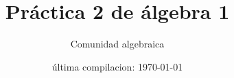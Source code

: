 

\usetikzlibrary{external,angles,quotes}

\def\V{\text{ verdadera }}
\def\eq?{\stackrel{\text{?}}}
\def\eqHI{\stackrel{\text{HI}}}
\def\eqDef{\stackrel{\text{def}}}




\title{Práctica 2 de álgebra 1} %
\author{Comunidad algebraica} %
\date{última compilacion: \today} %




